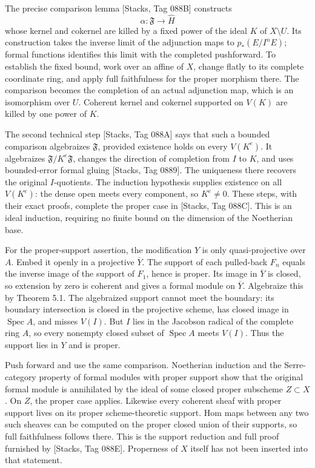 \documentclass[11pt]{article}
\begin{document}
The precise comparison lemma {[}Stacks, Tag 088B{]} constructs \[
\alpha:\mathfrak F\longrightarrow\widehat H
\] whose kernel and cokernel are killed by a fixed power of the ideal
\(K\) of \(X\setminus U\). Its construction takes the inverse limit of
the adjunction maps to \(p_*(E/I^nE)\); formal functions identifies this
limit with the completed pushforward. To establish the fixed bound, work
over an affine of \(X\), change flatly to its complete coordinate ring,
and apply full faithfulness for the proper morphism there. The
comparison becomes the completion of an actual adjunction map, which is
an isomorphism over \(U\). Coherent kernel and cokernel supported on
\(V(K)\) are killed by one power of \(K\).

The second technical step {[}Stacks, Tag 088A{]} says that such a
bounded comparison algebraizes \(\mathfrak F\), provided existence holds
on every \(V(K^e)\). It algebraizes \(\mathfrak F/K^e\mathfrak F\),
changes the direction of completion from \(I\) to \(K\), and uses
bounded-error formal gluing {[}Stacks, Tag 0889{]}. The uniqueness there
recovers the original \(I\)-quotients. The induction hypothesis supplies
existence on all \(V(K^e)\): the dense open meets every component, so
\(K^e\neq0\). These steps, with their exact proofs, complete the proper
case in {[}Stacks, Tag 088C{]}. This is an ideal induction, requiring no
finite bound on the dimension of the Noetherian base.

For the proper-support assertion, the modification \(Y\) is only
quasi-projective over \(A\). Embed it openly in a projective
\(\overline Y\). The support of each pulled-back \(F_n\) equals the
inverse image of the support of \(F_1\), hence is proper. Its image in
\(\overline Y\) is closed, so extension by zero is coherent and gives a
formal module on \(\overline Y\). Algebraize this by Theorem 5.1. The
algebraized support cannot meet the boundary: its boundary intersection
is closed in the projective scheme, has closed image in
\(\operatorname{Spec}A\), and misses \(V(I)\). But \(I\) lies in the
Jacobson radical of the complete ring \(A\), so every nonempty closed
subset of \(\operatorname{Spec}A\) meets \(V(I)\). Thus the support lies
in \(Y\) and is proper.

Push forward and use the same comparison. Noetherian induction and the
Serre-category property of formal modules with proper support show that
the original formal module is annihilated by the ideal of some closed
proper subscheme \(Z\subset X\). On \(Z\), the proper case applies.
Likewise every coherent sheaf with proper support lives on its proper
scheme-theoretic support. Hom maps between any two such sheaves can be
computed on the proper closed union of their supports, so full
faithfulness follows there. This is the support reduction and full proof
furnished by {[}Stacks, Tag 088E{]}. Properness of \(X\) itself has not
been inserted into that statement.
\end{document}

